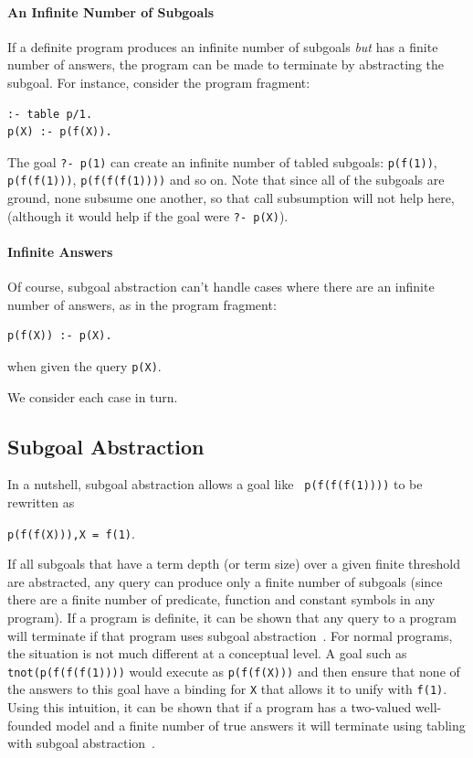 \paragraph{An Infinite Number of Subgoals}
%
If a definite program produces an infinite number of subgoals {\em
  but} has a finite number of answers, the program can be made to
terminate by abstracting the subgoal.  For instance, consider the
program fragment:
%
\begin{verbatim}
:- table p/1.
p(X) :- p(f(X)).
\end{verbatim}
%
The goal {\tt ?- p(1)} can create an infinite number of tabled
subgoals: {\tt p(f(1))}, {\tt p(f(f(1)))}, {\tt p(f(f(f(1))))} and so
on.  Note that since all of the subgoals are ground, none subsume one
another, so that call subsumption will not help here, (although it
would help if the goal were {\tt ?- p(X)}).

\paragraph*{Infinite Answers}
%
Of course, subgoal abstraction can't handle cases where there are an
infinite number of answers, as in the program fragment:
%
\begin{verbatim}
p(f(X)) :- p(X).
\end{verbatim}
%
when given the query {\tt p(X)}.  

We consider each case in turn.

\subsection{Subgoal Abstraction}
%
In a nutshell, subgoal abstraction allows a goal like {\tt
  p(f(f(f(1))))} to be rewritten as 

{\tt p(f(f(X))),X = f(1)}.  

\noindent
If all subgoals that have a term depth (or term size) over a given
finite threshold are abstracted, any query can produce only a finite
number of subgoals (since there are a finite number of predicate,
function and constant symbols in any program). If a program is
definite, it can be shown that any query to a program will terminate
if that program uses subgoal abstraction~\cite{TaSa86}.
%
For normal programs, the situation is not much different at a
conceptual level.  A goal such as {\tt tnot(p(f(f(f(1))))} would
execute as {\tt p(f(f(X)))} and then ensure that none of the answers
to this goal have a binding for {\tt X} that allows it to unify with
{\tt f(1)}.  Using this intuition, it can be shown that if a program
has a two-valued well-founded model and a finite number of true
answers it will terminate using tabling with subgoal
abstraction~\cite{RigS11b}.

